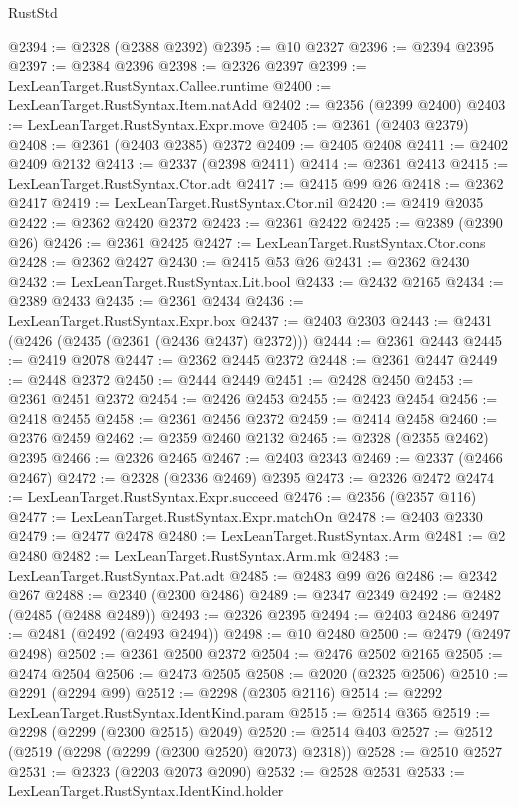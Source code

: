 \begin{lexlean}{RustStd}
\begin{coremodule}
@2394 := @2328 (@2388 @2392)
@2395 := @10 @2327
@2396 := @2394 @2395
@2397 := @2384 @2396
@2398 := @2326 @2397
@2399 := LexLeanTarget.RustSyntax.Callee.runtime
@2400 := LexLeanTarget.RustSyntax.Item.natAdd
@2402 := @2356 (@2399 @2400)
@2403 := LexLeanTarget.RustSyntax.Expr.move
@2405 := @2361 (@2403 @2379)
@2408 := @2361 (@2403 @2385) @2372
@2409 := @2405 @2408
@2411 := @2402 @2409 @2132
@2413 := @2337 (@2398 @2411)
@2414 := @2361 @2413
@2415 := LexLeanTarget.RustSyntax.Ctor.adt
@2417 := @2415 @99 @26
@2418 := @2362 @2417
@2419 := LexLeanTarget.RustSyntax.Ctor.nil
@2420 := @2419 @2035
@2422 := @2362 @2420 @2372
@2423 := @2361 @2422
@2425 := @2389 (@2390 @26)
@2426 := @2361 @2425
@2427 := LexLeanTarget.RustSyntax.Ctor.cons
@2428 := @2362 @2427
@2430 := @2415 @53 @26
@2431 := @2362 @2430
@2432 := LexLeanTarget.RustSyntax.Lit.bool
@2433 := @2432 @2165
@2434 := @2389 @2433
@2435 := @2361 @2434
@2436 := LexLeanTarget.RustSyntax.Expr.box
@2437 := @2403 @2303
@2443 := @2431 (@2426 (@2435 (@2361 (@2436 @2437) @2372)))
@2444 := @2361 @2443
@2445 := @2419 @2078
@2447 := @2362 @2445 @2372
@2448 := @2361 @2447
@2449 := @2448 @2372
@2450 := @2444 @2449
@2451 := @2428 @2450
@2453 := @2361 @2451 @2372
@2454 := @2426 @2453
@2455 := @2423 @2454
@2456 := @2418 @2455
@2458 := @2361 @2456 @2372
@2459 := @2414 @2458
@2460 := @2376 @2459
@2462 := @2359 @2460 @2132
@2465 := @2328 (@2355 @2462) @2395
@2466 := @2326 @2465
@2467 := @2403 @2343
@2469 := @2337 (@2466 @2467)
@2472 := @2328 (@2336 @2469) @2395
@2473 := @2326 @2472
@2474 := LexLeanTarget.RustSyntax.Expr.succeed
@2476 := @2356 (@2357 @116)
@2477 := LexLeanTarget.RustSyntax.Expr.matchOn
@2478 := @2403 @2330
@2479 := @2477 @2478
@2480 := LexLeanTarget.RustSyntax.Arm
@2481 := @2 @2480
@2482 := LexLeanTarget.RustSyntax.Arm.mk
@2483 := LexLeanTarget.RustSyntax.Pat.adt
@2485 := @2483 @99 @26
@2486 := @2342 @267
@2488 := @2340 (@2300 @2486)
@2489 := @2347 @2349
@2492 := @2482 (@2485 (@2488 @2489))
@2493 := @2326 @2395
@2494 := @2403 @2486
@2497 := @2481 (@2492 (@2493 @2494))
@2498 := @10 @2480
@2500 := @2479 (@2497 @2498)
@2502 := @2361 @2500 @2372
@2504 := @2476 @2502 @2165
@2505 := @2474 @2504
@2506 := @2473 @2505
@2508 := @2020 (@2325 @2506)
@2510 := @2291 (@2294 @99)
@2512 := @2298 (@2305 @2116)
@2514 := @2292 LexLeanTarget.RustSyntax.IdentKind.param
@2515 := @2514 @365
@2519 := @2298 (@2299 (@2300 @2515) @2049)
@2520 := @2514 @403
@2527 := @2512 (@2519 (@2298 (@2299 (@2300 @2520) @2073) @2318))
@2528 := @2510 @2527
@2531 := @2323 (@2203 @2073 @2090)
@2532 := @2528 @2531
@2533 := LexLeanTarget.RustSyntax.IdentKind.holder

\end{coremodule}
\end{lexlean}
